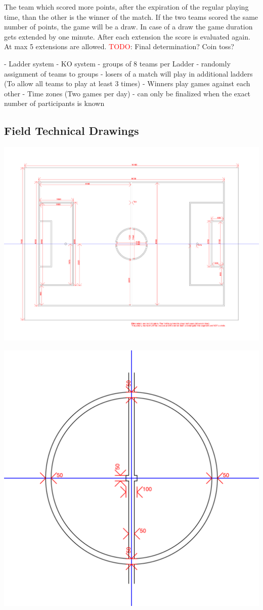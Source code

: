 The team which scored more points, after the expiration of the regular playing time, than the other is the winner of the match. If the two teams scored the same number of points, the game will be a draw. In case of a draw the game duration gets extended by one minute. After each extension the score is evaluated again. At max 5 extensions are allowed. 
\textcolor{red}{TODO}: Final determination? Coin toss?


- Ladder system
- KO system 
- groups of 8 teams per Ladder
- randomly assignment of teams to groups
- losers of a match will play in additional ladders (To allow all teams to play at least 3 times)
- Winners play games against each other
- Time zones (Two games per day)
- can only be finalized when the exact number of participants is known
    
\newpage

\subsection{Field Technical Drawings}
\label{apx:technical-drawing}
\centerline{\includegraphics[angle=90,origin=c,width=\columnwidth]{figs/fieldDimensions2020_technical.pdf}}

\clearpage
\centerline{\includegraphics[angle=90,origin=c,width=0.5\columnwidth]{figs/fieldDimensions2020_technical_cc.pdf}}

